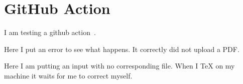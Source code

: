 \section{GitHub Action}

I am testing a github action~\cite{latex-action}.

Here I put an error to see what happens.  It correctly did not upload a PDF.

Here I am putting an input {with} no corresponding file.  When I TeX on my machine it waits for me to correct myself.
